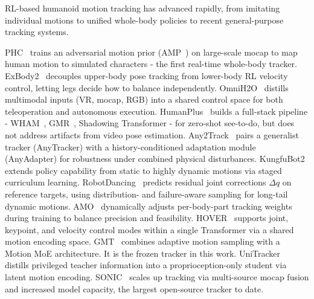 \documentclass{article}
\begin{document}




	RL-based humanoid motion tracking has advanced rapidly, from imitating individual motions to unified whole-body policies to recent general-purpose tracking systems.
	
	PHC~\cite{phcluo2023} trains an adversarial motion prior (AMP~\cite{amp2021}) on large-scale mocap to map human motion to simulated characters - the first real-time whole-body tracker. ExBody2~\cite{exbodyji2024} decouples upper-body pose tracking from lower-body RL velocity control, letting legs decide how to balance independently. OmniH2O~\cite{omnih2ohe2024} distills multimodal inputs (VR, mocap, RGB) into a shared control space for both teleoperation and autonomous execution. HumanPlus~\cite{humanplus2024} builds a full-stack pipeline - WHAM~\cite{whamshin2024}, GMR~\cite{gmr2025}, Shadowing Transformer - for zero-shot see-to-do, but does not address artifacts from video pose estimation. Any2Track~\cite{zhang2025track} pairs a generalist tracker (AnyTracker) with a history-conditioned adaptation module (AnyAdapter) for robustness under combined physical disturbances. KungfuBot2~\cite{han2025kungfubot2} extends policy capability from static to highly dynamic motions via staged curriculum learning. RobotDancing~\cite{sun2025robotdancing} predicts residual joint corrections $\Delta q$ on reference targets, using distribution- and failure-aware sampling for long-tail dynamic motions. AMO~\cite{li2025amo} dynamically adjusts per-body-part tracking weights during training to balance precision and feasibility. HOVER~\cite{hover2025} supports joint, keypoint, and velocity control modes within a single Transformer via a shared motion encoding space. GMT~\cite{gmtchen2025} combines adaptive motion sampling with a Motion MoE architecture. It is the frozen tracker in this work. UniTracker~\cite{uniyin2025} distills privileged teacher information into a proprioception-only student via latent motion encoding. SONIC~\cite{sonic2025} scales up tracking via multi-source mocap fusion and increased model capacity, the largest open-source tracker to date.
	
\end{document}
